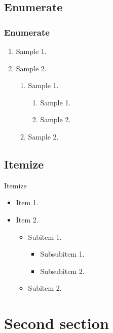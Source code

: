 \documentclass{beamer}
\begin{document}
\subsection{Enumerate}
\begin{frame}
    \frametitle{Enumerate}
    \begin{enumerate}
        \item Sample 1.
        \item Sample 2.
            \begin{enumerate}
                \item Sample 1.
                    \begin{enumerate}
                        \item Sample 1.
                        \item Sample 2.
                    \end{enumerate}
                \item Sample 2.
            \end{enumerate}
    \end{enumerate}
\end{frame}


\subsection{Itemize}
\begin{frame}{Itemize}
    \begin{itemize}
        \item Item 1.
        \item Item 2.
            \begin{itemize}
                \item Subitem 1.
                    \begin{itemize}
                        \item Subsubitem 1.
                        \item Subsubitem 2.
                    \end{itemize}
                \item Subitem 2.
            \end{itemize}
    \end{itemize}
\end{frame}


\section{Second section}
\end{document}
